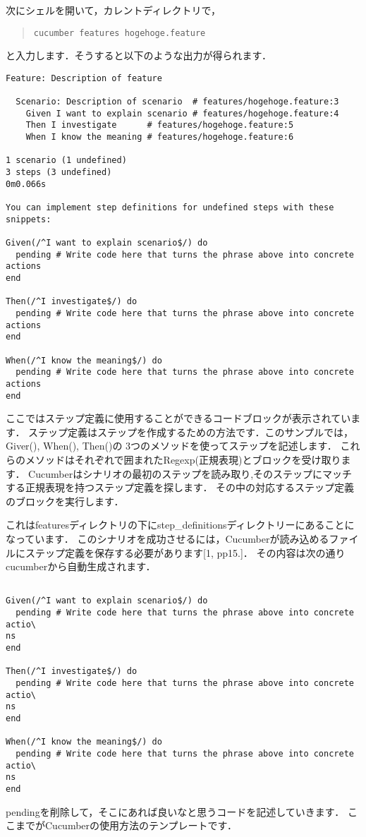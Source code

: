 次にシェルを開いて，カレントディレクトリで，
\begin{quote}\begin{verbatim}
cucumber features hogehoge.feature
\end{verbatim}\end{quote}
と入力します．そうすると以下のような出力が得られます．
\begin{lstlisting}[style=customRuby]
Feature: Description of feature

  Scenario: Description of scenario  # features/hogehoge.feature:3
    Given I want to explain scenario # features/hogehoge.feature:4
    Then I investigate      # features/hogehoge.feature:5
    When I know the meaning # features/hogehoge.feature:6

1 scenario (1 undefined)
3 steps (3 undefined)
0m0.066s

You can implement step definitions for undefined steps with these snippets:

Given(/^I want to explain scenario$/) do
  pending # Write code here that turns the phrase above into concrete actions
end

Then(/^I investigate$/) do
  pending # Write code here that turns the phrase above into concrete actions
end

When(/^I know the meaning$/) do
  pending # Write code here that turns the phrase above into concrete actions
end

\end{lstlisting}
ここではステップ定義に使用することができるコードブロックが表示されています．
ステップ定義はステップを作成するための方法です．このサンプルでは，Giver(), When(), Then()の
3つのメソッドを使ってステップを記述します．
これらのメソッドはそれぞれ\/\/で囲まれたRegexp(正規表現)とブロックを受け取ります．
Cucumberはシナリオの最初のステップを読み取り,そのステップにマッチする正規表現を持つステップ定義を探します．
その中の対応するステップ定義のブロックを実行します．

これはfeaturesディレクトリの下にstep\_definitionsディレクトリーにあることになっています．
このシナリオを成功させるには，Cucumberが読み込めるファイルにステップ定義を保存する必要があります[1, pp15.]．
その内容は次の通りcucumberから自動生成されます．
\begin{lstlisting}[style=customRuby]

Given(/^I want to explain scenario$/) do
  pending # Write code here that turns the phrase above into concrete actio\
ns  
end

Then(/^I investigate$/) do
  pending # Write code here that turns the phrase above into concrete actio\
ns  
end

When(/^I know the meaning$/) do
  pending # Write code here that turns the phrase above into concrete actio\
ns  
end

\end{lstlisting}
pendingを削除して，そこにあれば良いなと思うコードを記述していきます．
ここまでがCucumberの使用方法のテンプレートです．

